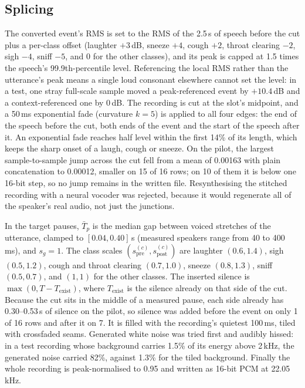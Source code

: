 \documentclass{article} %
\begin{document}
\subsection{Splicing}
The converted event's RMS is set to the RMS of the 2.5\,s of speech before the cut plus a
per-class offset (laughter $+3$\,dB, sneeze $+4$, cough $+2$, throat clearing $-2$, sigh $-4$,
sniff $-5$, and 0 for the other classes), and its peak is capped at 1.5 times the speech's
99.9th-percentile level. Referencing the local RMS rather than the utterance's peak means a
single loud consonant elsewhere cannot set the level: in a test, one stray full-scale sample
moved a peak-referenced event by $+10.4$\,dB and a context-referenced one by 0\,dB. The recording
is cut at the slot's midpoint, and a 50\,ms exponential fade (curvature $k{=}5$) is applied to
all four edges: the end of the speech before the cut, both ends of the event and the start of
the speech after it. An exponential fade reaches half level within the first 14\% of its length,
which keeps the sharp onset of a laugh, cough or sneeze. On the pilot, the largest
sample-to-sample jump across the cut fell from a mean of 0.00163 with plain concatenation to
0.00012, smaller on 15 of 16 rows; on 10 of them it is below one 16-bit step, so no jump
remains in the written file. Resynthesising the stitched recording with a neural vocoder was
rejected, because it would regenerate all of the speaker's real audio, not just the junctions.

In the target pauses, $\bar{T}_{p}$ is the median gap between voiced stretches of the
utterance, clamped to $[0.04, 0.40]$\,s (measured speakers range from 40 to 400\,ms), and
$s_g{=}1$. The class scales $(s_{\mathrm{pre}}^{(c)}, s_{\mathrm{post}}^{(c)})$ are laughter
$(0.6, 1.4)$, sigh $(0.5, 1.2)$, cough and throat clearing $(0.7, 1.0)$, sneeze $(0.8, 1.3)$,
sniff $(0.5, 0.7)$, and $(1, 1)$ for the other classes.
The inserted silence is $\max(0, T - T_{\mathrm{exist}})$, where $T_{\mathrm{exist}}$ is the
silence already on that side of the cut. Because the cut sits in the middle of a measured pause,
each side already has 0.30--0.53\,s of silence on the pilot, so silence was added before the
event on only 1 of 16 rows and after it on 7. It is filled with the recording's quietest
100\,ms, tiled with crossfaded seams. Generated white noise was tried first and audibly hissed:
in a test recording whose background carries 1.5\% of its energy above 2\,kHz, the generated
noise carried 82\%, against 1.3\% for the tiled background. Finally the whole recording is
peak-normalised to 0.95 and written as 16-bit PCM at 22.05\,kHz.
\end{document}
